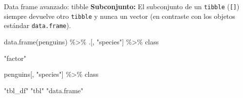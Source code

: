 \documentclass[
  ignorenonframetext,
  aspectratio=169]{beamer}
\newenvironment{Shaded}{\begin{snugshade}}{\end{snugshade}}
\newcommand{\FunctionTok}[1]{\textcolor[rgb]{0.00,0.00,0.00}{#1}}
\newcommand{\NormalTok}[1]{#1}
\newcommand{\SpecialCharTok}[1]{\textcolor[rgb]{0.00,0.00,0.00}{#1}}
\newcommand{\StringTok}[1]{\textcolor[rgb]{0.31,0.60,0.02}{#1}}
\let\oldverbatim\verbatim
\let\endoldverbatim\endverbatim
\renewenvironment{verbatim}{\tiny\oldverbatim}{\endoldverbatim}
\begin{document}
\begin{frame}[fragile]{Data frame avanzado: tibble}
\protect\hypertarget{data-frame-avanzado-tibble-8}{}
\textbf{Subconjunto:} El subconjunto de un \texttt{tibble}
(\texttt{{[}{]}}) siempre devuelve otro \texttt{tibble} y nunca un
vector (en contraste con los objetos estándar \texttt{data.frame}).

\begin{Shaded}
\begin{Highlighting}[]
\FunctionTok{data.frame}\NormalTok{(penguins) }\SpecialCharTok{\%\textgreater{}\%}\NormalTok{ .[, }\StringTok{"species"}\NormalTok{] }\SpecialCharTok{\%\textgreater{}\%}\NormalTok{ class}
\end{Highlighting}
\end{Shaded}

\begin{verbatim}
[1] "factor"
\end{verbatim}

\begin{Shaded}
\begin{Highlighting}[]
\NormalTok{penguins[, }\StringTok{"species"}\NormalTok{] }\SpecialCharTok{\%\textgreater{}\%}\NormalTok{ class}
\end{Highlighting}
\end{Shaded}

\begin{verbatim}
[1] "tbl_df"     "tbl"        "data.frame"
\end{verbatim}
\end{frame}
\end{document}

